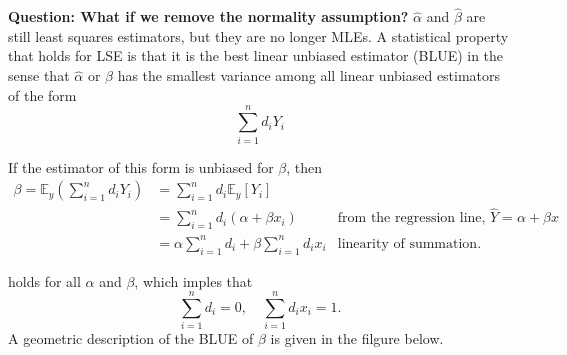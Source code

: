 \begin{example}[(cont.)]
    \textbf{Question: What if we remove the normality assumption? } 
    $\widehat{\alpha}$ and $\widehat{\beta}$ are still least squares estimators, but they are no longer MLEs.
    A statistical property that holds for LSE is that it is the best linear unbiased estimator (BLUE) 
    in the sense that $\widehat{\alpha}$ or $\widehat{\beta}$ has the smallest variance among all linear unbiased estimators of the form 
    \begin{equation}
        \sum^n_{i=1} d_i Y_i
    \end{equation}

If the estimator of this form is unbiased for $\beta$, then 
\begin{align*}
    \beta = \mathbb{E}_y\left( \sum^n_{i=1} d_iY_i \right) &= \sum^n_{i = 1} d_i \mathbb{E}_y[Y_i]\\
    &= \sum^n_{i = 1} d_i (\alpha + \beta x_i) & \text{from the regression line, } \widehat{Y} = \alpha + \beta x\\
    &= \alpha \sum^n_{i = 1} d_i + \beta \sum^n_{i = 1} d_i x_i & \text{linearity of summation}.
\end{align*}

holds for all $\alpha$ and $\beta$, which imples that 
\[
    \sum^n_{i = 1} d_i = 0, \quad \sum^n_{i = 1} d_i x_i = 1.
\]
A geometric description  of the BLUE of $\beta$ is given in the filgure below.

\end{example}
